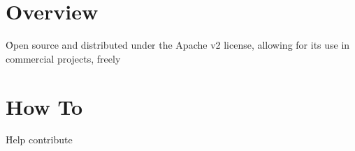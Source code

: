 \chapter{Overview}

\r{Open source and distributed under the Apache v2 license, allowing for its use in commercial projects, freely}


\chapter{How To}

\r{Help contribute}